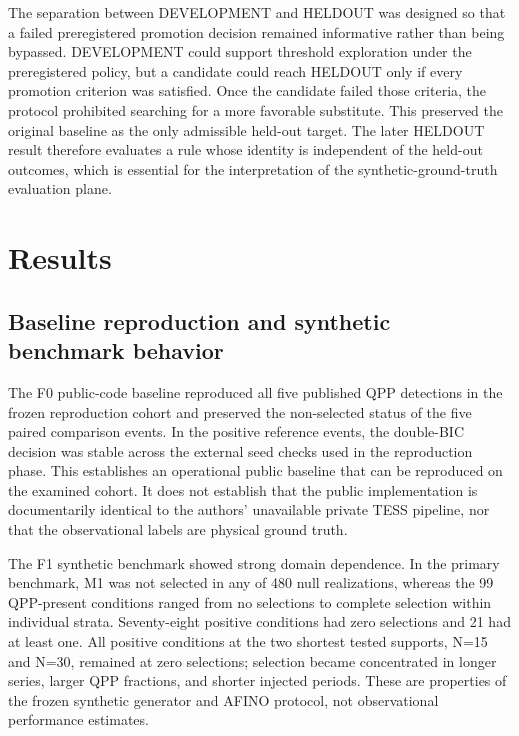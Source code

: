 \documentclass[manuscript,linenumbers]{aastex702}
\begin{document}
The separation between DEVELOPMENT and HELDOUT was designed so that a failed preregistered promotion decision remained informative rather than being bypassed. DEVELOPMENT could support threshold exploration under the preregistered policy, but a candidate could reach HELDOUT only if every promotion criterion was satisfied. Once the candidate failed those criteria, the protocol prohibited searching for a more favorable substitute. This preserved the original baseline as the only admissible held-out target. The later HELDOUT result therefore evaluates a rule whose identity is independent of the held-out outcomes, which is essential for the interpretation of the synthetic-ground-truth evaluation plane.

\section{Results}
\subsection{Baseline reproduction and synthetic benchmark behavior}
The F0 public-code baseline reproduced all five published QPP detections in the frozen reproduction cohort and preserved the non-selected status of the five paired comparison events. In the positive reference events, the double-BIC decision was stable across the external seed checks used in the reproduction phase. This establishes an operational public baseline that can be reproduced on the examined cohort. It does not establish that the public implementation is documentarily identical to the authors' unavailable private TESS pipeline, nor that the observational labels are physical ground truth.

The F1 synthetic benchmark showed strong domain dependence. In the primary benchmark, M1 was not selected in any of 480 null realizations, whereas the 99 QPP-present conditions ranged from no selections to complete selection within individual strata. Seventy-eight positive conditions had zero selections and 21 had at least one. All positive conditions at the two shortest tested supports, N=15 and N=30, remained at zero selections; selection became concentrated in longer series, larger QPP fractions, and shorter injected periods. These are properties of the frozen synthetic generator and AFINO protocol, not observational performance estimates.
\end{document}

